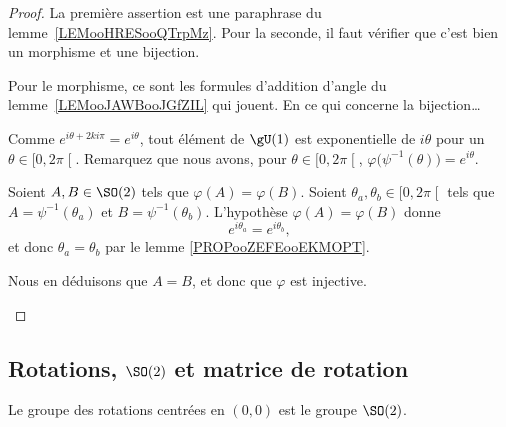 \begin{proof}
	La première assertion est une paraphrase du lemme~\ref{LEMooHRESooQTrpMz}. Pour la seconde, il faut vérifier que c'est bien un morphisme et une bijection.

	Pour le morphisme, ce sont les formules d'addition d'angle du lemme~\ref{LEMooJAWBooJGfZIL} qui jouent. En ce qui concerne la bijection\ldots

	\begin{subproof}
		\spitem[Surjection]
		Comme \( e^{i\theta+2ki\pi}= e^{i\theta}\), tout élément de \( \gU(1)\) est exponentielle de \( i\theta\) pour un \( \theta\in\mathopen[ 0 , 2\pi \mathclose[\).
		\spitem[Injection]
		Remarquez que nous avons, pour \( \theta\in\mathopen[ 0 , 2\pi \mathclose[\), \( \varphi\big( \psi^{-1}(\theta) \big)= e^{i\theta}\).

		Soient \( A,B\in \SO(2)\) tels que \( \varphi(A)=\varphi(B)\). Soient \( \theta_a,\theta_b\in\mathopen[ 0 , 2\pi \mathclose[\) tels que \( A=\psi^{-1}(\theta_a)\) et \( B=\psi^{-1}(\theta_b)\). L'hypothèse \( \varphi(A)=\varphi(B)\) donne
		\begin{equation}
			e^{i\theta_a}= e^{i\theta_b},
		\end{equation}
		et donc \( \theta_a=\theta_b\) par le lemme \ref{PROPooZEFEooEKMOPT}.

		Nous en déduisons que \( A=B\), et donc que \( \varphi\) est injective.
	\end{subproof}
\end{proof}

\subsection{Rotations, \( \SO(2)\) et matrice de rotation}

\begin{corollary} \label{CORooVYUJooDbkIFY}
	Le groupe des rotations centrées en \( (0,0)\) est le groupe \( \SO(2)\).
\end{corollary}

